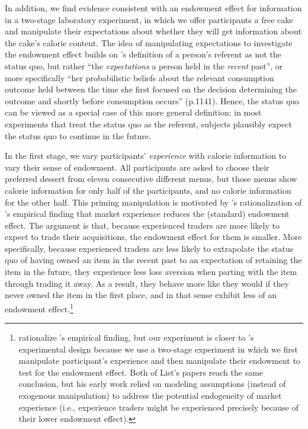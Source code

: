 
In addition, we find evidence consistent with an endowment effect for information in a two-stage laboratory experiment, in which we offer participants a free cake and manipulate their expectations about whether they will get information about the cake’s calorie content. The idea of manipulating expectations to investigate the endowment effect builds on \citet{koszegiModelReferenceDependentPreferences2006}'s definition of a person’s referent as not the status quo, but rather \enquote{the \emph{expectations} a person held in the \emph{recent} past}, or more specifically \enquote{her probabilistic beliefs about the relevant consumption outcome held between the time she first focused on the decision determining the outcome and shortly before consumption occurs} (p.1141). Hence, the status quo can be viewed as a special case of this more general definition: in most experiments that treat the status quo as the referent, subjects plausibly expect the status quo to continue in the future.

In the first stage, we vary participants’ \emph{experience} with calorie information to vary their sense of endowment. All participants are asked to choose their preferred dessert from eleven consecutive different menus, but those menus show calorie information for only half of the participants, and no calorie information for the other half. This priming manipulation is motivated by \citet{koszegiModelReferenceDependentPreferences2006}'s rationalization of \citet{listDoesMarketExperience2003}'s empirical finding that market experience reduces the (standard) endowment effect. The argument is that, because experienced traders are more likely to expect to trade their acquisitions, the endowment effect for them is smaller. More specifically, because experienced traders are less likely to extrapolate the status quo of having owned an item in the recent past to an expectation of retaining the item in the future, they experience less loss aversion when parting with the item through trading it away. As a result, they behave more like they would if they never owned the item in the first place, and in that sense exhibit less of an endowment effect.\footnote{\citet{koszegiModelReferenceDependentPreferences2006} rationalize \citet{listDoesMarketExperience2003}'s empirical finding, but our experiment is closer to \citet{listDoesMarketExperience2011}'s experimental design because we use a two-stage experiment in which we first manipulate participant's experience and then manipulate their endowment to test for the endowment effect. Both of List's papers reach the same conclusion, but his early work relied on modeling assumptions (instead of exogenous manipulation) to address the potential endogeneity of market experience (i.e., experience traders might be experienced precisely because of their lower endowment effect).}


